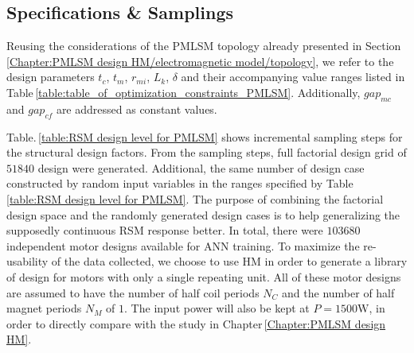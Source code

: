         
        \subsection{Specifications \& Samplings}    \label{Chapter:RSM/PMLSM/spec}
        
        
            Reusing the considerations of the \acs{PMLSM} topology already presented in Section\,\ref{Chapter:PMLSM design HM/electromagnetic model/topology}, we refer to the design parameters $t_c$, $t_m$, $r_{mi}$, $L_k$, $\delta$ and their accompanying value ranges listed in Table\,\ref{table:table_of_optimization_constraints_PMLSM}. Additionally, $gap_{mc}$ and $gap_{cf}$ are addressed as constant values. 
            
            
            Table.\,\ref{table:RSM design level for PMLSM} shows incremental sampling steps for the structural design factors. From the sampling steps, full factorial design grid of $51840$ design were generated. Additional, the same number of design case constructed by random input variables in the ranges specified by Table\,\ref{table:RSM design level for PMLSM}. The purpose of combining the factorial design space and the randomly generated design cases is to help generalizing the supposedly continuous \acs{RSM} response better. In total, there were $103680$ independent motor designs available for \acs{ANN} training. To maximize the re-usability of the data collected, we choose to use \acs{HM} in order to generate a library of design for motors with only a single repeating unit. All of these motor designs are assumed to have the number of half coil periods $N_C$ and the number of half magnet periods $N_M$ of $1$. The input power will also be kept at $P=1500\mathrm{W}$, in order to directly compare with the study in Chapter\,\ref{Chapter:PMLSM design HM}.
            
